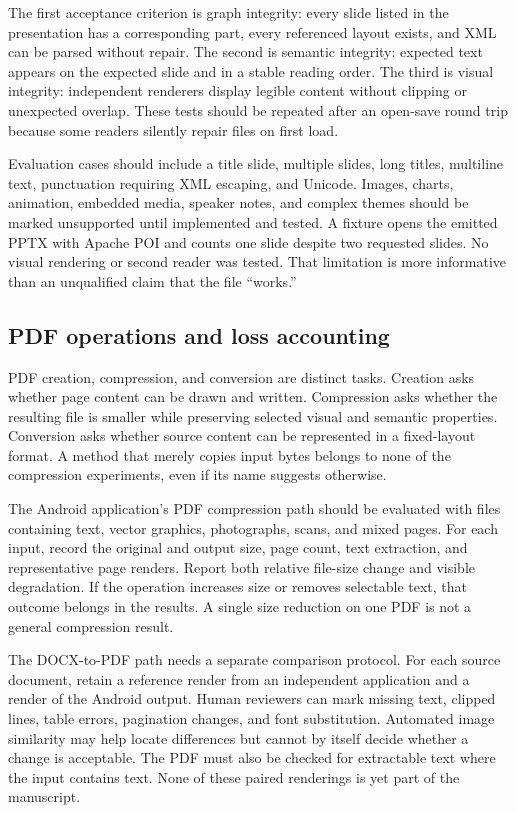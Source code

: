 \documentclass[10pt,letterpaper]{article}
\begin{document}
The first acceptance criterion is graph integrity: every slide listed in the presentation has a corresponding part, every referenced layout exists, and XML can be parsed without repair. The second is semantic integrity: expected text appears on the expected slide and in a stable reading order. The third is visual integrity: independent renderers display legible content without clipping or unexpected overlap. These tests should be repeated after an open-save round trip because some readers silently repair files on first load.

Evaluation cases should include a title slide, multiple slides, long titles, multiline text, punctuation requiring XML escaping, and Unicode. Images, charts, animation, embedded media, speaker notes, and complex themes should be marked unsupported until implemented and tested. A fixture opens the emitted PPTX with Apache POI and counts one slide despite two requested slides. No visual rendering or second reader was tested. That limitation is more informative than an unqualified claim that the file ``works.''

\subsection{PDF operations and loss accounting}

PDF creation, compression, and conversion are distinct tasks. Creation asks whether page content can be drawn and written. Compression asks whether the resulting file is smaller while preserving selected visual and semantic properties. Conversion asks whether source content can be represented in a fixed-layout format. A method that merely copies input bytes belongs to none of the compression experiments, even if its name suggests otherwise.

The Android application's PDF compression path should be evaluated with files containing text, vector graphics, photographs, scans, and mixed pages. For each input, record the original and output size, page count, text extraction, and representative page renders. Report both relative file-size change and visible degradation. If the operation increases size or removes selectable text, that outcome belongs in the results. A single size reduction on one PDF is not a general compression result.

The DOCX-to-PDF path needs a separate comparison protocol. For each source document, retain a reference render from an independent application and a render of the Android output. Human reviewers can mark missing text, clipped lines, table errors, pagination changes, and font substitution. Automated image similarity may help locate differences but cannot by itself decide whether a change is acceptable. The PDF must also be checked for extractable text where the input contains text. None of these paired renderings is yet part of the manuscript.
\end{document}

